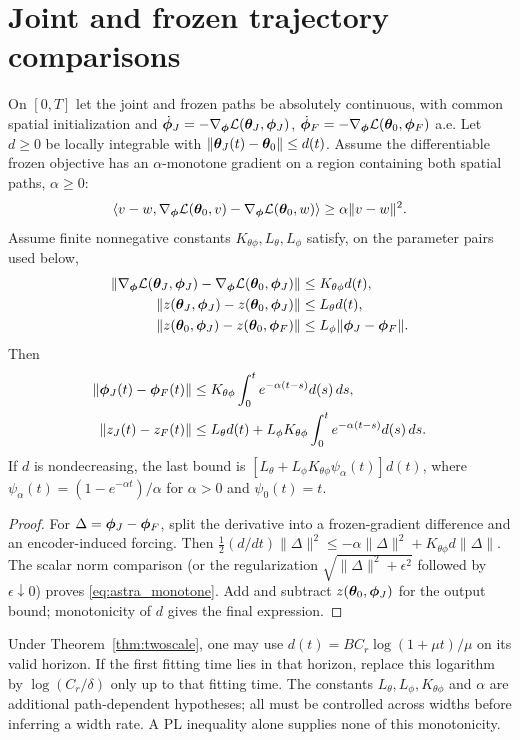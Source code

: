 \section{Joint and frozen trajectory comparisons}
\label{sec:astra_bridges}
\begin{theorem}
\label{thm:astra_monotone}
On $[0,T]$ let the joint and frozen paths be absolutely continuous,
with common spatial initialization and
$\dot{{\boldsymbol{\phi}}}_J=-\nabla_{\boldsymbol{\phi}}\mathcal{L}({\boldsymbol{\theta}}_J,{\boldsymbol{\phi}}_J)$,
$\dot{{\boldsymbol{\phi}}}_F=-\nabla_{\boldsymbol{\phi}}\mathcal{L}({\boldsymbol{\theta}}_0,{\boldsymbol{\phi}}_F)$ a.e.
Let $d\ge0$ be locally integrable with
$\|{\boldsymbol{\theta}}_J(t)-{\boldsymbol{\theta}}_0\|\le d(t)$.
Assume the differentiable frozen objective has an $\alpha$-monotone
gradient on a region containing both spatial paths, $\alpha\ge0$:
\[
 \langle v-w,\nabla_{\boldsymbol{\phi}}\mathcal{L}({\boldsymbol{\theta}}_0,v)
 -\nabla_{\boldsymbol{\phi}}\mathcal{L}({\boldsymbol{\theta}}_0,w)\rangle\ge\alpha\|v-w\|^2.
\]
Assume finite nonnegative constants $K_{\theta\phi},L_\theta,L_\phi$
satisfy, on the parameter pairs used below,
\begin{align*}
 \|\nabla_{\boldsymbol{\phi}}\mathcal{L}({\boldsymbol{\theta}}_J,{\boldsymbol{\phi}}_J)
       -\nabla_{\boldsymbol{\phi}}\mathcal{L}({\boldsymbol{\theta}}_0,{\boldsymbol{\phi}}_J)\|&\le K_{\theta\phi}d(t),\\
 \|z({\boldsymbol{\theta}}_J,{\boldsymbol{\phi}}_J)-z({\boldsymbol{\theta}}_0,{\boldsymbol{\phi}}_J)\|&\le L_\theta d(t),\\
 \|z({\boldsymbol{\theta}}_0,{\boldsymbol{\phi}}_J)-z({\boldsymbol{\theta}}_0,{\boldsymbol{\phi}}_F)\|&\le L_\phi\|{\boldsymbol{\phi}}_J-{\boldsymbol{\phi}}_F\|.
\end{align*}
Then
\begin{align}
 \|{\boldsymbol{\phi}}_J(t)-{\boldsymbol{\phi}}_F(t)\|&\le K_{\theta\phi}\int_0^t e^{-\alpha(t-s)}d(s)\,ds,
 \label{eq:astra_monotone}\\
 \|z_J(t)-z_F(t)\|&\le L_\theta d(t)+
 L_\phi K_{\theta\phi}\int_0^t e^{-\alpha(t-s)}d(s)\,ds.
\end{align}
If $d$ is nondecreasing, the last bound is
$[L_\theta+L_\phi K_{\theta\phi}\psi_\alpha(t)]d(t)$, where
$\psi_\alpha(t)=(1-e^{-\alpha t})/\alpha$ for $\alpha>0$ and
$\psi_0(t)=t$.
\end{theorem}
\begin{proof}
For $\Delta={\boldsymbol{\phi}}_J-{\boldsymbol{\phi}}_F$, split the derivative into a frozen-gradient
difference and an encoder-induced forcing. Then
$\frac12(d/dt)\|\Delta\|^2\le-\alpha\|\Delta\|^2+
K_{\theta\phi}d\|\Delta\|$. The scalar norm comparison (or the
regularization $\sqrt{\|\Delta\|^2+\epsilon^2}$ followed by
$\epsilon\downarrow0$) proves \eqref{eq:astra_monotone}. Add and subtract
$z({\boldsymbol{\theta}}_0,{\boldsymbol{\phi}}_J)$ for the output bound; monotonicity of $d$ gives
the final expression.
\end{proof}
\begin{remark}
Under Theorem~\ref{thm:twoscale}, one may use
$d(t)=BC_r\log(1+\mu t)/\mu$ on its valid horizon. If the first fitting
time lies in that horizon, replace this logarithm by $\log(C_r/\delta)$
only up to that fitting time. The constants $L_\theta,L_\phi,K_{\theta\phi}$
and $\alpha$ are additional path-dependent hypotheses; all must be
controlled across widths before inferring a width rate. A PL inequality
alone supplies none of this monotonicity.
\end{remark}


